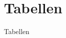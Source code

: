 \documentclass{beamer}
\begin{document}
\section{Tabellen}
\begin{frame}
 \begin{center}
  \Huge Tabellen
 \end{center}
\end{frame}
% 
% 
\end{document}
